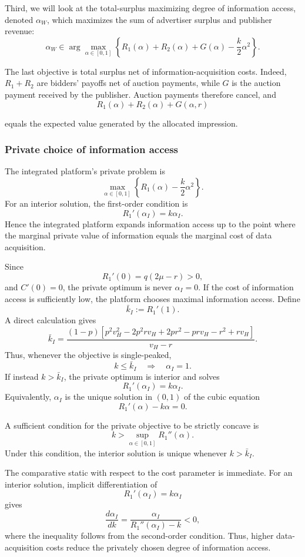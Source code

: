 Third, we will look at the total-surplus maximizing degree of information access, denoted $ \alpha_W $, which maximizes the sum of advertiser surplus and publisher revenue:
\[
\alpha_W\in
\arg\max_{\alpha\in[0,1]}
\left\{
R_1(\alpha)+R_2(\alpha)+G(\alpha)-\frac{k}{2}\alpha^2
\right\}.
\]

\noindent The last objective is total surplus net of information-acquisition costs. Indeed, $ R_1+R_2 $ are bidders' payoffs net of auction payments, while $G$ is the auction payment received by the publisher. Auction payments therefore cancel, and
\[
 R_1(\alpha) + R_2(\alpha) + G(\alpha,r)
\]

\noindent equals the expected value generated by the allocated impression.

\subsubsection{Private choice of information access}

The integrated platform's private problem is
\[
\max_{\alpha\in[0,1]}
\left\{
R_1(\alpha)-\frac{k}{2}\alpha^2
\right\}.
\]
For an interior solution, the first-order condition is
\[
R_1'(\alpha_I)=k\alpha_I.
\]
Hence the integrated platform expands information access up to the point where the marginal
private value of information equals the marginal cost of data acquisition.

Since
\[
R_1'(0)=q(2\mu-r)>0,
\]
and $C'(0)=0$, the private optimum is never $\alpha_I=0$. If the cost of information access is
sufficiently low, the platform chooses maximal information access. Define
\[
\bar k_I:=R_1'(1).
\]
A direct calculation gives
\[
\bar k_I
=
\frac{
(1-p)
\left[
p^2v_H^2
-2p^2rv_H
+2pr^2
-prv_H
-r^2
+rv_H
\right]
}{
v_H-r
}.
\]
Thus, whenever the objective is single-peaked,
\[
k\le \bar k_I
\quad\Longrightarrow\quad
\alpha_I=1.
\]
If instead $k>\bar k_I$, the private optimum is interior and solves
\[
R_1'(\alpha_I)=k\alpha_I.
\]
Equivalently, $\alpha_I$ is the unique solution in $(0,1)$ of the cubic equation
\[
R_1'(\alpha)-k\alpha=0.
\]

\begin{rem}
A sufficient condition for the private objective to be strictly concave is
\[
k>\sup_{\alpha\in[0,1]} R_1''(\alpha).
\]
Under this condition, the interior solution is unique whenever $k>\bar k_I$.
\end{rem}

The comparative static with respect to the cost parameter is immediate. For an interior solution,
implicit differentiation of
\[
R_1'(\alpha_I)=k\alpha_I
\]
gives
\[
\frac{d\alpha_I}{dk}
=
\frac{\alpha_I}{R_1''(\alpha_I)-k}<0,
\]
where the inequality follows from the second-order condition. Thus, higher data-acquisition
costs reduce the privately chosen degree of information access.

